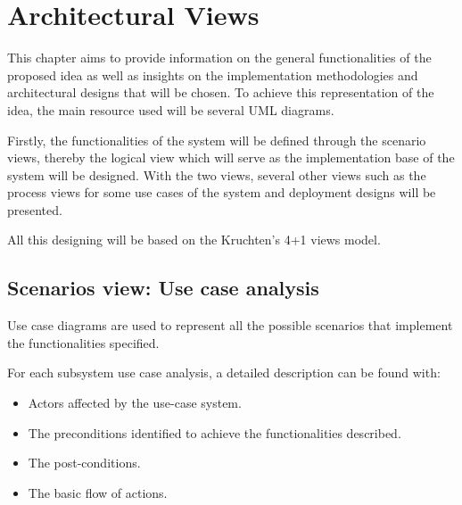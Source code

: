 \section{Architectural Views}
This chapter aims to provide information on the general functionalities of the proposed idea 
as well as insights on the implementation methodologies and architectural designs that will be chosen. 
To achieve this representation of the idea, the main resource used will be several UML diagrams.

Firstly, the functionalities of the system will be defined through the scenario views, thereby the logical 
view which will serve as the implementation base of the system will be designed. 
With the two views, several other views such as the process views for some use cases of the system and 
deployment designs will be presented.

All this designing will be based on the Kruchten’s 4+1 views model\cite{ArchitecturalBlueprints4+1}.

\subsection{Scenarios view: Use case analysis}

Use case diagrams are used to represent all the possible scenarios that implement the functionalities specified.

For each subsystem use case analysis, a detailed description can be found with:
\begin{itemize}
    \item Actors affected by the use-case system.
    \item The preconditions identified to achieve the functionalities described.
    \item The post-conditions.
    \item The basic flow of actions.
\end{itemize}

